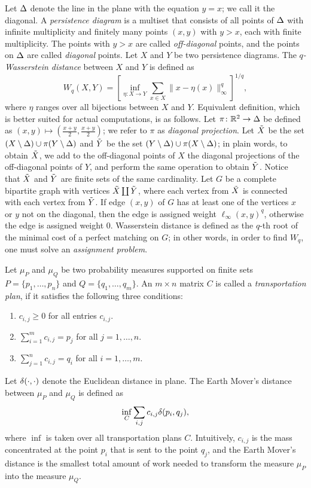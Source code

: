 \documentclass[]{ws-ijcga}
\renewcommand{\geq}{\geqslant}
\newcommand{\RR}{\mathbb{R}}
\newcommand{\wsdist}[1]{{W_{#1}}}
\begin{document}
Let ${\Delta}$ denote the line in the plane with the equation $y = x$; we call it the diagonal.
A \textit{persistence diagram} is a
multiset that consists of all points of ${\Delta}$ with infinite multiplicity
and finitely many points $(x, y)$ with $y > x$, each with finite multiplicity.
The points with $y > x$ are called \textit{off-diagonal} points,
and the points on ${\Delta}$ are called \textit{diagonal} points.
Let $X$ and $Y$ be two persistence diagrams.
The \emph{$q$-Wasserstein distance} between $X$ and $Y$ is defined as
\[
    \wsdist{q}(X,Y) = \left[ \inf_{\eta:X\rightarrow Y} \sum_{x\in X} \|x-\eta(x)\|_\infty^q\right]^{1/q},
\]
where $\eta$ ranges over all bijections between $X$ and $Y$.
Equivalent definition, which is better suited for actual computations,
is as follows. Let $\pi\colon \RR^2 \to \diag$ be defined
as $(x,y) \mapsto (\frac{x+y}{2}, \frac{x+y}{2})$; we refer to $\pi$ as \textit{diagonal
projection}. Let ${\tilde{X}}$ be the set $(X\setminus {\Delta}) \cup \pi(Y \setminus {\Delta})$
and ${\tilde{Y}}$ be the set $(Y\setminus {\Delta}) \cup \pi(X \setminus {\Delta})$; in plain words,
to obtain ${\tilde{X}}$, we add to the off-diagonal points of $X$
the diagonal projections of the off-diagonal points of $Y$,
and perform the same operation to obtain ${\tilde{Y}}$. Notice that ${\tilde{X}}$ and ${\tilde{Y}}$
are finite sets of the same cardinality. Let $G$ be a complete bipartite
graph with vertices ${\tilde{X}} \coprod {\tilde{Y}}$, where each vertex from ${\tilde{X}}$
is connected with each vertex from ${\tilde{Y}}$. If edge $(x,y)$ of $G$
has at least one of the vertices $x$ or $y$ not on the diagonal,
then the edge is assigned weight $\ell_{\infty}(x, y)^q$, otherwise
the edge is assigned weight 0. Wasserstein distance is defined as the $q$-th
root of the minimal cost of a perfect matching on $G$; in other words,
in order to find $\wsdist{q}$, one must solve an \textit{assignment problem}.


Let $\mu_P$ and $\mu_Q$
be two probability measures supported
on finite sets $P = \{p_1, \dots, p_n \}$
and $Q = \{ q_1, \dots, q_m \}$.
An $m \times n$ matrix $C$
is called a \textit{transportation plan},
if it satisfies the following three conditions:
\begin{enumerate}
    \item $c_{i,j} \geq 0$ for all entries $c_{i, j}$.
    \item $\sum_{i = 1}^m c_{i, j} = p_j$ for all $j = 1, \dots, n$.
    \item $\sum_{j = 1}^n c_{i, j} = q_i$ for all $i = 1, \dots, m$.
\end{enumerate}
Let $\delta(\cdot, \cdot)$ denote the Euclidean
distance in plane.
The Earth Mover's distance between $\mu_P$ and $\mu_Q$
is defined as
\[
    \inf_C \sum_{i, j} c_{i, j} \delta(p_i, q_j),
\]
where $\inf$ is taken over all transportation
plans $C$. Intuitively, $c_{i,j}$ is the
mass concentrated at the point $p_i$ that
is sent to the point $q_j$, and the Earth Mover's
distance is the smallest total amount of work
needed to transform the measure $\mu_P$
into the measure $\mu_Q$.
\end{document}
